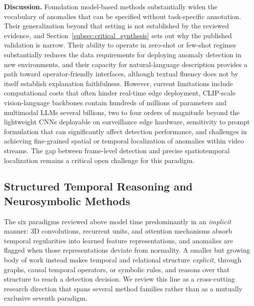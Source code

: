 \documentclass[10pt,a4paper]{article}
\begin{document}
\textbf{Discussion.} Foundation model-based methods substantially widen the vocabulary of anomalies that can be specified without task-specific annotation. Their generalization beyond that setting is not established by the reviewed evidence, and Section~\ref{subsec:critical_synthesis} sets out why the published validation is narrow. Their ability to operate in zero-shot or few-shot regimes substantially reduces the data requirements for deploying anomaly detection in new environments, and their capacity for natural-language description provides a path toward operator-friendly interfaces, although textual fluency does not by itself establish explanation faithfulness. However, current limitations include computational costs that often hinder real-time edge deployment, CLIP-scale vision-language backbones contain hundreds of millions of parameters and multimodal LLMs several billions, two to four orders of magnitude beyond the lightweight CNNs deployable on surveillance edge hardware, sensitivity to prompt formulation that can significantly affect detection performance, and challenges in achieving fine-grained spatial or temporal localization of anomalies within video streams. The gap between frame-level detection and precise spatiotemporal localization remains a critical open challenge for this paradigm.


\subsection{Structured Temporal Reasoning and Neurosymbolic Methods}
\label{subsec:temporal_neurosymbolic}

The six paradigms reviewed above model time predominantly in an \emph{implicit} manner: 3D convolutions, recurrent units, and attention mechanisms absorb temporal regularities into learned feature representations, and anomalies are flagged when those representations deviate from normality. A smaller but growing body of work instead makes temporal and relational structure \emph{explicit}, through graphs, causal temporal operators, or symbolic rules, and reasons over that structure to reach a detection decision. We review this line as a cross-cutting research direction that spans several method families rather than as a mutually exclusive seventh paradigm.
\end{document}
